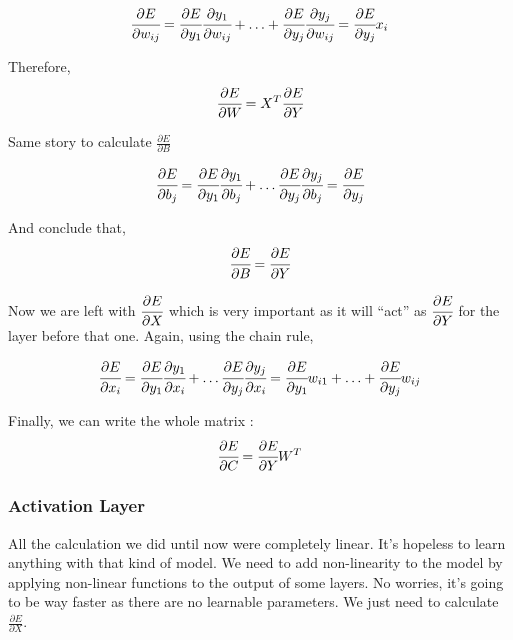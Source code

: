 \begin{equation}
\cfrac{\partial E}{\partial w_{ij}} = \cfrac{\partial E}{\partial y_1}\cfrac{\partial y_1}{\partial w_{ij}} + \ldots + \cfrac{\partial E}{\partial y_j}\cfrac{\partial y_j}{\partial w_{ij}} = \cfrac{\partial E}{\partial y_j}x_i 
\end{equation}

Therefore,
\begin{equation}
\cfrac{\partial E}{\partial W} = X^T\cfrac{\partial E}{\partial Y}
\end{equation}

Same story to calculate $\frac{\partial E}{\partial B}$

\begin{equation}
\cfrac{\partial E}{\partial b_j} = \cfrac{\partial E}{\partial y_1}\cfrac{\partial y_1}{\partial b_j} + \ldots \cfrac{\partial E}{\partial y_j}\cfrac{\partial y_j}{\partial b_j} = \cfrac{\partial E}{\partial y_j} 
\end{equation}

And conclude that,
\begin{equation}
\cfrac{\partial E}{\partial B} = \cfrac{\partial E}{\partial Y}
\end{equation}

Now we are left with $\cfrac{\partial E}{\partial X}$ which is very important as it will “act” as $\cfrac{\partial E}{\partial Y}$ for the layer before that one. Again, using the chain rule,

\begin{equation}
\cfrac{\partial E}{\partial x_i} = \cfrac{\partial E}{\partial y_1}\cfrac{\partial y_1}{\partial x_i} + \ldots \cfrac{\partial E}{\partial y_j}\cfrac{\partial y_j}{\partial x_i} = \cfrac{\partial E}{\partial y_1} w_{i1} + \ldots + \cfrac{\partial E}{\partial y_j} w_{ij} 
\end{equation}

Finally, we can write the whole matrix :
\begin{equation}
\cfrac{\partial E}{\partial C} = \cfrac{\partial E}{\partial Y}W^T
\end{equation}


\subsubsection{Activation Layer}
All the calculation we did until now were completely linear. It's hopeless to learn anything with that kind of model. We need to add non-linearity to the model by applying non-linear functions to the output of some layers.
No worries, it’s going to be way faster as there are no learnable parameters. We just need to calculate $\frac{\partial E}{\partial X}$.


